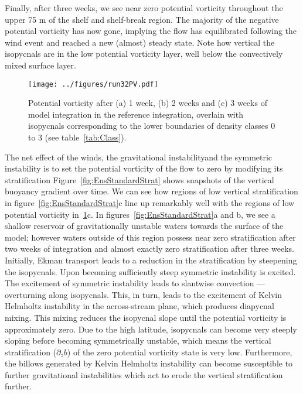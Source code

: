 Finally, after three weeks, we see near zero potential vorticity throughout the upper 75 m of the shelf and shelf-break region. The majority of the negative potential vorticity has now gone, implying the flow has equilibrated following the wind event and reached a new (almost) steady state. Note how vertical the isopycnals are in the low potential vorticity layer, well below the convectively mixed surface layer.

\begin{figure} 
    \centering
    \texttt{[image: ../figures/run32PV.pdf]}
    \caption{Potential vorticity after (a) 1 week, (b) 2 weeks and (c) 3 weeks of model integration in the reference integration, overlain with isopycnals corresponding to the lower boundaries of density classes 0 to 3 (see table~\ref{tab:Class}).}
    \label{fig:EnsStandardPV}
\end{figure}

The net effect of the winds, the gravitational instability\footnotemark and the symmetric instability is to set the potential vorticity of the flow to zero by modifying its stratification
Figure~\ref{fig:EnsStandardStrat} shows snapshots of the vertical buoyancy gradient over time. We can see how regions of low vertical stratification in figure~\ref{fig:EnsStandardStrat}c line up remarkably well with the regions of low potential vorticity in~\ref{fig:EnsStandardPV}c. In figures~\ref{fig:EnsStandardStrat}a and b, we see a shallow reservoir of gravitationally unstable waters towards the surface of the model; however waters outside of this region possess near zero stratification after two weeks of integration and almost exactly zero stratification after three weeks. Initially, Ekman transport leads to a reduction in the stratification by steepening the isopycnals. Upon becoming sufficiently steep symmetric instability is excited. The excitement of symmetric instability leads to slantwise convection --- overturning along isopycnals. This, in turn, leads to the excitement of Kelvin Helmholtz instability in the across-stream plane, which produces diapycnal mixing. This mixing reduces the isopycnal slope until the potential vorticity is approximately zero. Due to the high latitude, isopycnals can become very steeply sloping before becoming symmetrically unstable\footnotemark, which means the vertical stratification ($\partial_z b$) of the zero potential vorticity state is very low. Furthermore, the billows generated by Kelvin Helmholtz instability can become susceptible to further gravitational instabilities which act to erode the vertical stratification further.

